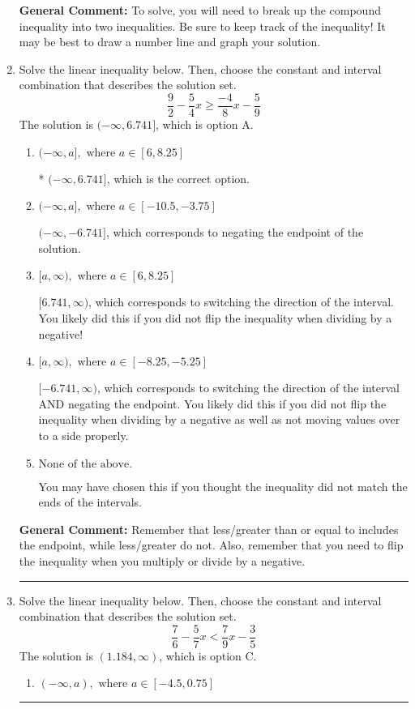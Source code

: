 \documentclass{extbook}[14pt]
\newcommand{\litem}[1]{\item #1

\rule{\textwidth}{0.4pt}}
\begin{document}
\begin{enumerate}
{\begin{enumerate}[label=\Alph*.]
\end{enumerate}

\textbf{General Comment:} To solve, you will need to break up the compound inequality into two inequalities. Be sure to keep track of the inequality! It may be best to draw a number line and graph your solution.
}
\litem{
Solve the linear inequality below. Then, choose the constant and interval combination that describes the solution set.
\[ \frac{9}{2} - \frac{5}{4} x \geq \frac{-4}{8} x - \frac{5}{9} \]The solution is \( (-\infty, 6.741] \), which is option A.\begin{enumerate}[label=\Alph*.]
\item \( (-\infty, a], \text{ where } a \in [6, 8.25] \)

* $(-\infty, 6.741]$, which is the correct option.
\item \( (-\infty, a], \text{ where } a \in [-10.5, -3.75] \)

 $(-\infty, -6.741]$, which corresponds to negating the endpoint of the solution.
\item \( [a, \infty), \text{ where } a \in [6, 8.25] \)

 $[6.741, \infty)$, which corresponds to switching the direction of the interval. You likely did this if you did not flip the inequality when dividing by a negative!
\item \( [a, \infty), \text{ where } a \in [-8.25, -5.25] \)

 $[-6.741, \infty)$, which corresponds to switching the direction of the interval AND negating the endpoint. You likely did this if you did not flip the inequality when dividing by a negative as well as not moving values over to a side properly.
\item \( \text{None of the above}. \)

You may have chosen this if you thought the inequality did not match the ends of the intervals.
\end{enumerate}

\textbf{General Comment:} Remember that less/greater than or equal to includes the endpoint, while less/greater do not. Also, remember that you need to flip the inequality when you multiply or divide by a negative.
}
\litem{
Solve the linear inequality below. Then, choose the constant and interval combination that describes the solution set.
\[ \frac{7}{6} - \frac{5}{7} x < \frac{7}{9} x - \frac{3}{5} \]The solution is \( (1.184, \infty) \), which is option C.\begin{enumerate}[label=\Alph*.]
\item \( (-\infty, a), \text{ where } a \in [-4.5, 0.75] \)


\end{enumerate}}
\end{enumerate}
\end{document}
